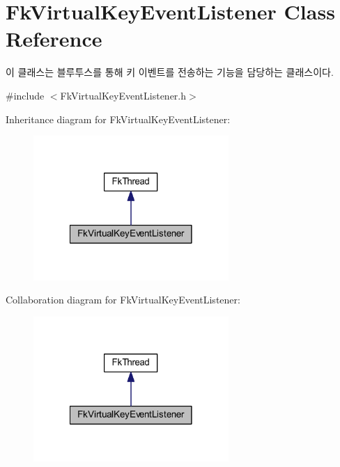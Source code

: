 \hypertarget{class_fk_virtual_key_event_listener}{}\section{Fk\+Virtual\+Key\+Event\+Listener Class Reference}
\label{class_fk_virtual_key_event_listener}


이 클래스는 블루투스를 통해 키 이벤트를 전송하는 기능을 담당하는 클래스이다.  




{\ttfamily \#include $<$Fk\+Virtual\+Key\+Event\+Listener.\+h$>$}



Inheritance diagram for Fk\+Virtual\+Key\+Event\+Listener\+:
\nopagebreak
\begin{figure}[H]
\begin{center}
\leavevmode
\includegraphics[width=210pt]{class_fk_virtual_key_event_listener__inherit__graph}
\end{center}
\end{figure}


Collaboration diagram for Fk\+Virtual\+Key\+Event\+Listener\+:
\nopagebreak
\begin{figure}[H]
\begin{center}
\leavevmode
\includegraphics[width=210pt]{class_fk_virtual_key_event_listener__coll__graph}
\end{center}
\end{figure}
